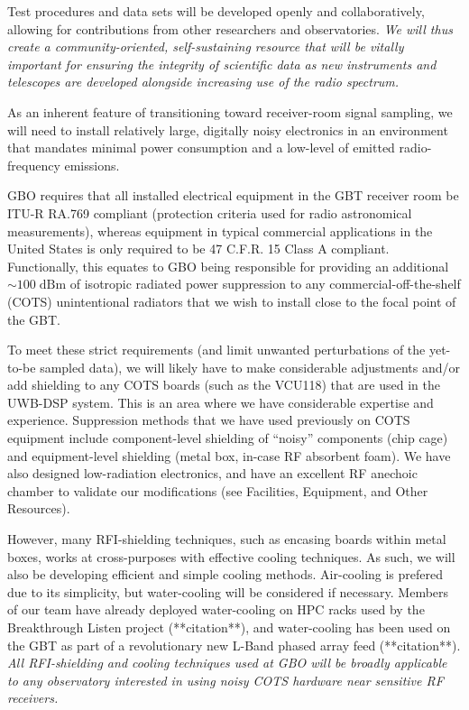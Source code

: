 \documentclass[10pt]{myNSF}
\begin{document}
Test procedures and data sets will be developed openly and
collaboratively, allowing for contributions from other researchers and
observatories.  \emph{We will thus create a community-oriented,
  self-sustaining resource that will be vitally important for ensuring
  the integrity of scientific data as new instruments and telescopes
  are developed alongside increasing use of the radio spectrum.}


As an inherent feature of transitioning toward receiver-room signal
sampling, we will need to install relatively large, digitally noisy
electronics in an environment that mandates minimal power consumption
and a low-level of emitted radio-frequency emissions.

GBO requires that all installed electrical equipment in the GBT
receiver room be ITU-R RA.769 compliant (protection criteria used for
radio astronomical measurements), whereas equipment in typical
commercial applications in the United States is only required to be 47
C.F.R. 15 Class A compliant. Functionally, this equates to GBO being
responsible for providing an additional $\sim 100\; \mathrm{dBm}$ of
isotropic radiated power suppression to any commercial-off-the-shelf
(COTS) unintentional radiators that we wish to install close to the
focal point of the GBT.

To meet these strict requirements (and limit unwanted perturbations of
the yet-to-be sampled data), we will likely have to make considerable
adjustments and/or add shielding to any COTS boards (such as the
VCU118) that are used in the UWB-DSP system.  This is an area where we
have considerable expertise and experience. Suppression methods that
we have used previously on COTS equipment include component-level
shielding of ``noisy'' components (chip cage) and equipment-level
shielding (metal box, in-case RF absorbent foam). We have also
designed low-radiation electronics, and have an excellent RF anechoic
chamber to validate our modifications (see Facilities, Equipment, and
Other Resources).

However, many RFI-shielding techniques, such as encasing boards within
metal boxes, works at cross-purposes with effective cooling
techniques. As such, we will also be developing efficient and simple
cooling methods.  Air-cooling is prefered due to its simplicity, but
water-cooling will be considered if necessary.  Members of our team
have already deployed water-cooling on HPC racks used by the
Breakthrough Listen project (**citation**), and water-cooling has been
used on the GBT as part of a revolutionary new L-Band phased array
feed (**citation**).  \emph{All RFI-shielding and cooling techniques
  used at GBO will be broadly applicable to any observatory interested
  in using noisy COTS hardware near sensitive RF receivers.}
\end{document}
